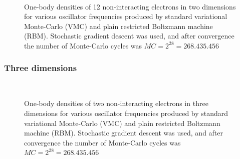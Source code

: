 \begin{figure} [H]%
	\centering
	\\
	
	\caption{One-body densities of 12 non-interacting electrons in two dimensions for various oscillator frequencies produced by standard variational Monte-Carlo (VMC) and plain restricted Boltzmann machine (RBM). Stochastic gradient descent was used, and after convergence the number of Monte-Carlo cycles was $MC=2^{28}=268.435.456$}%
	\label{fig:OB_interaction_12P_2D}
\end{figure}

\subsubsection{Three dimensions}
\begin{figure} [H]%
	\centering
	\\
	
	\caption{One-body densities of two non-interacting electrons in three dimensions for various oscillator frequencies produced by standard variational Monte-Carlo (VMC) and plain restricted Boltzmann machine (RBM). Stochastic gradient descent was used, and after convergence the number of Monte-Carlo cycles was $MC=2^{28}=268.435.456$}%
	\label{fig:OB_interaction_2P_3D}
\end{figure}

